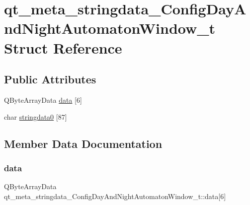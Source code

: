 \hypertarget{structqt__meta__stringdata___config_day_and_night_automaton_window__t}{}\section{qt\+\_\+meta\+\_\+stringdata\+\_\+\+Config\+Day\+And\+Night\+Automaton\+Window\+\_\+t Struct Reference}
\label{structqt__meta__stringdata___config_day_and_night_automaton_window__t}
\subsection*{Public Attributes}
\begin{DoxyCompactItemize}
\item 
Q\+Byte\+Array\+Data \mbox{\hyperlink{structqt__meta__stringdata___config_day_and_night_automaton_window__t_a6baf4d795c25979a23599baf7fcb5d7c}{data}} \mbox{[}6\mbox{]}
\item 
char \mbox{\hyperlink{structqt__meta__stringdata___config_day_and_night_automaton_window__t_a0b6a8b2c663f058c14437f0589cbb4af}{stringdata0}} \mbox{[}87\mbox{]}
\end{DoxyCompactItemize}


\subsection{Member Data Documentation}
\mbox{\label{structqt__meta__stringdata___config_day_and_night_automaton_window__t_a6baf4d795c25979a23599baf7fcb5d7c}} 
\subsubsection{\texorpdfstring{data}{data}}
{\footnotesize\ttfamily Q\+Byte\+Array\+Data qt\+\_\+meta\+\_\+stringdata\+\_\+\+Config\+Day\+And\+Night\+Automaton\+Window\+\_\+t\+::data\mbox{[}6\mbox{]}}

